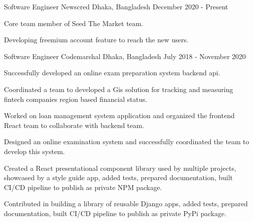 \begin{cventries}

\cventry
    {Software Engineer}
    {Newscred}
    {Dhaka, Bangladesh}
    {December 2020 - Present}
    {
      \begin{cvitemsNumber}[Responsibilities:]
        \item {Core team member of Seed The Market team.}
        \vspace{1mm}
        \item{Developing freemium account feature to reach the new users.}
      \end{cvitemsNumber}
    }

\cventry
    {Software Engineer}
    {Codemarshal}
    {Dhaka, Bangladesh}
    {July 2018 - November 2020}
    {
      \begin{cvitemsNumber}[Responsibilities:]
        \item {Successfully developed an online exam preparation system backend api.}
        \vspace{1mm}
        \item {Coordinated a team to developed a Gis solution for tracking and measuring fintech companies region based financial status.}
        \vspace{1mm}
        \item {Worked on loan management system application and organized the frontend React team to collaborate with backend team.}
        \vspace{1mm}
        \item {Designed an online examination system and successfully coordinated the team to develop this system.}
        \vspace{1mm}
        \item {Created a React presentational component library used by multiple projects, showcased by a style guide app, added tests, prepared documentation, built CI/CD pipeline to publish as private NPM package.}
        \vspace{1mm}
        \item {Contributed in building a library of reusable Django apps, added tests, prepared documentation, built CI/CD pipeline to publish as private PyPi package.}
        \vspace{1mm}
      \end{cvitemsNumber}
    }


\end{cventries}
